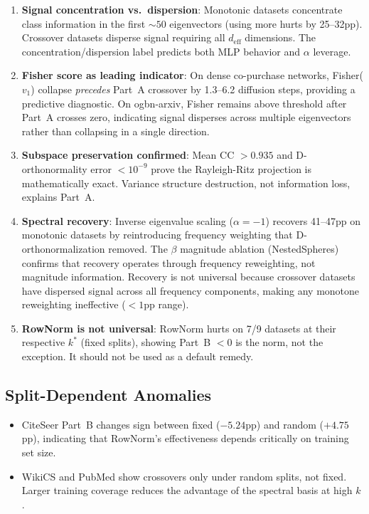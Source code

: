 \documentclass[11pt]{article}
\begin{document}
\begin{enumerate}
  \item \textbf{Signal concentration vs.\ dispersion}: Monotonic datasets concentrate
    class information in the first ${\sim}50$ eigenvectors (using more hurts by 25--32pp).
    Crossover datasets disperse signal requiring all $d_{\text{eff}}$ dimensions.
    The concentration/dispersion label predicts both MLP behavior and $\alpha$ leverage.

  \item \textbf{Fisher score as leading indicator}: On dense co-purchase networks,
    Fisher($v_1$) collapse \emph{precedes} Part~A crossover by 1.3--6.2 diffusion steps,
    providing a predictive diagnostic.  On ogbn-arxiv, Fisher remains above threshold
    after Part~A crosses zero, indicating signal disperses across multiple eigenvectors
    rather than collapsing in a single direction.

  \item \textbf{Subspace preservation confirmed}: Mean CC $> 0.935$ and D-orthonormality
    error $< 10^{-9}$ prove the Rayleigh-Ritz projection is mathematically exact.
    Variance structure destruction, not information loss, explains Part~A.

  \item \textbf{Spectral recovery}: Inverse eigenvalue scaling ($\alpha{=}-1$) recovers
    41--47pp on monotonic datasets by reintroducing frequency weighting that
    D-orthonormalization removed.  The $\beta$ magnitude ablation (NestedSpheres) confirms
    that recovery operates through frequency reweighting, not magnitude information.
    Recovery is not universal because crossover datasets have dispersed signal across
    all frequency components, making any monotone reweighting ineffective ($<1$pp range).

  \item \textbf{RowNorm is not universal}: RowNorm hurts on 7/9 datasets at their
    respective $k^*$ (fixed splits), showing Part~B $< 0$ is the norm, not the exception.
    It should not be used as a default remedy.
\end{enumerate}

\subsection{Split-Dependent Anomalies}

\begin{itemize}
  \item CiteSeer Part~B changes sign between fixed ($-5.24$pp) and random ($+4.75$pp),
    indicating that RowNorm's effectiveness depends critically on training set size.
  \item WikiCS and PubMed show crossovers only under random splits, not fixed.
    Larger training coverage reduces the advantage of the spectral basis at high $k$.
\end{itemize}
\end{document}
